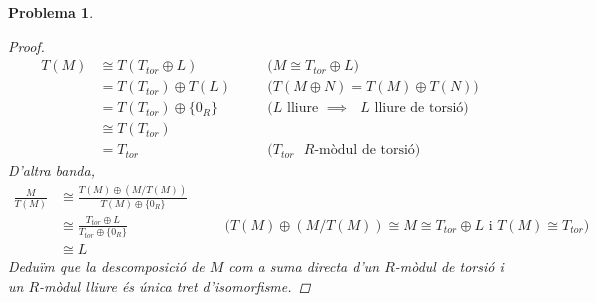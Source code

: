 \documentclass[compress]{article}
\newtheorem{problema}{Problema}
\theoremstyle{definition}
\begin{document}
\begin{problema}
\begin{proof}
\begin{align*}
            T(M)
            &\cong T(T_{tor}\oplus L)
            &\quad&\textrm{($M\cong T_{tor}\oplus L$)}\\
            &=T(T_{tor})\oplus T(L)
            &\quad&\textrm{($T(M\oplus N)=T(M)\oplus T(N)$)}\\
            &=T(T_{tor})\oplus\{0_{R}\}
            &\quad&\textrm{($L$ lliure $\implies$ $L$ lliure de torsió)}\\
            &\cong T(T_{tor})
            \\
            &=T_{tor}
            &\quad&\textrm{($T_{tor}$ $R$-mòdul de torsió)}
        \end{align*}
        D'altra banda,
        \begin{align*}
            \frac{M}{T(M)}
            &\cong\frac{T(M)\oplus(M/T(M))}{T(M)\oplus\{0_{R}\}}\\
            &\cong\frac{T_{tor}\oplus L}{T_{tor}\oplus\{0_{R}\}}
            &\quad&\textrm{($T(M)\oplus(M/T(M))\cong M\cong T_{tor}\oplus L$ i $T(M)\cong T_{tor}$)}\\
            &\cong L
        \end{align*}
        Deduïm que la descomposició de $M$ com a suma directa d'un $R$-mòdul de torsió i un $R$-mòdul lliure és única tret d'isomorfisme.
    \end{proof}
\end{problema}
\end{document}
